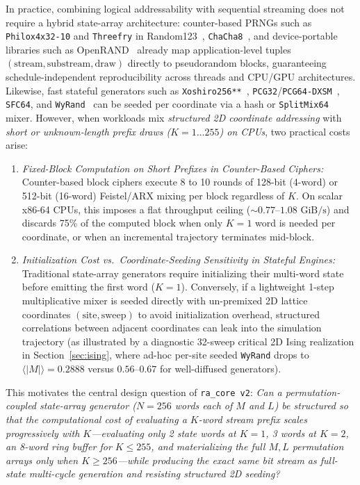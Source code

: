 \documentclass[conference]{IEEEtran}
\begin{document}
In practice, combining logical addressability with sequential streaming does not require a hybrid state-array architecture: counter-based PRNGs such as \texttt{Philox4x32-10} and \texttt{Threefry} in Random123~\cite{salmon2011parallel}, \texttt{ChaCha8}~\cite{bernstein2008chacha}, and device-portable libraries such as OpenRAND~\cite{shashidhar2025openrand} already map application-level tuples $(\text{stream}, \text{substream}, \text{draw})$ directly to pseudorandom blocks, guaranteeing schedule-independent reproducibility across threads and CPU/GPU architectures. Likewise, fast stateful generators such as \texttt{Xoshiro256**}~\cite{blackman2018scrambled}, \texttt{PCG32}/\texttt{PCG64-DXSM}~\cite{oneill2014pcg}, \texttt{SFC64}, and \texttt{WyRand}~\cite{wang2019wyhash} can be seeded per coordinate via a hash or \texttt{SplitMix64} mixer. However, when workloads mix \emph{structured 2D coordinate addressing} with \emph{short or unknown-length prefix draws ($K=1\ldots 255$) on CPUs}, two practical costs arise:
\begin{enumerate}
    \item \emph{Fixed-Block Computation on Short Prefixes in Counter-Based Ciphers:} Counter-based block ciphers execute 8 to 10 rounds of 128-bit (4-word) or 512-bit (16-word) Feistel/ARX mixing per block regardless of $K$. On scalar x86-64 CPUs, this imposes a flat throughput ceiling ($\sim 0.77$--$1.08\text{ GiB/s}$) and discards 75\% of the computed block when only $K=1$ word is needed per coordinate, or when an incremental trajectory terminates mid-block.
    \item \emph{Initialization Cost vs.\ Coordinate-Seeding Sensitivity in Stateful Engines:} Traditional state-array generators require initializing their multi-word state before emitting the first word ($K=1$). Conversely, if a lightweight 1-step multiplicative mixer is seeded directly with un-premixed 2D lattice coordinates $(\text{site}, \text{sweep})$ to avoid initialization overhead, structured correlations between adjacent coordinates can leak into the simulation trajectory (as illustrated by a diagnostic 32-sweep critical 2D Ising realization in Section~\ref{sec:ising}, where ad-hoc per-site seeded \texttt{WyRand} drops to $\langle |M| \rangle = 0.2888$ versus $0.56$--$0.67$ for well-diffused generators).
\end{enumerate}

This motivates the central design question of \texttt{ra\_core v2}: \emph{Can a permutation-coupled state-array generator ($N=256$ words each of $M$ and $L$) be structured so that the computational cost of evaluating a $K$-word stream prefix scales progressively with $K$---evaluating only 2 state words at $K=1$, 3 words at $K=2$, an 8-word ring buffer for $K \le 255$, and materializing the full $M, L$ permutation arrays only when $K \ge 256$---while producing the exact same bit stream as full-state multi-cycle generation and resisting structured 2D seeding?}
\end{document}
